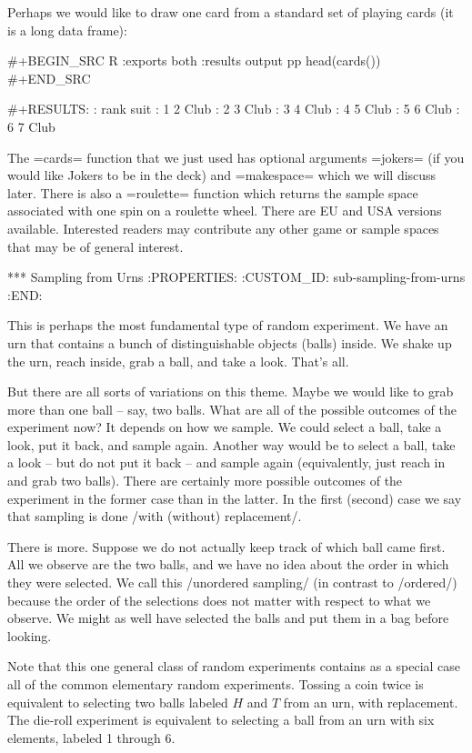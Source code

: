 Perhaps we would like to draw one card from a standard set of playing
cards (it is a long data frame):

#+BEGIN_SRC R :exports both :results output pp
head(cards()) 
#+END_SRC

#+RESULTS:
:   rank suit
: 1    2 Club
: 2    3 Club
: 3    4 Club
: 4    5 Club
: 5    6 Club
: 6    7 Club

The =cards= function that we just used has optional arguments =jokers=
(if you would like Jokers to be in the deck) and =makespace= which we
will discuss later. There is also a =roulette= function which returns
the sample space associated with one spin on a roulette wheel. There
are EU and USA versions available. Interested readers may contribute
any other game or sample spaces that may be of general interest.

*** Sampling from Urns
:PROPERTIES:
:CUSTOM_ID: sub-sampling-from-urns
:END:

This is perhaps the most fundamental type of random experiment. We
have an urn that contains a bunch of distinguishable objects (balls)
inside. We shake up the urn, reach inside, grab a ball, and take a
look. That's all.

But there are all sorts of variations on this theme. Maybe we would
like to grab more than one ball -- say, two balls. What are all of the
possible outcomes of the experiment now? It depends on how we
sample. We could select a ball, take a look, put it back, and sample
again. Another way would be to select a ball, take a look -- but do
not put it back -- and sample again (equivalently, just reach in and
grab two balls). There are certainly more possible outcomes of the
experiment in the former case than in the latter. In the first
(second) case we say that sampling is done /with (without)
replacement/.

There is more. Suppose we do not actually keep track of which ball
came first. All we observe are the two balls, and we have no idea
about the order in which they were selected. We call this /unordered
sampling/ (in contrast to /ordered/) because the order of the
selections does not matter with respect to what we observe. We might
as well have selected the balls and put them in a bag before looking.

Note that this one general class of random experiments contains as a
special case all of the common elementary random experiments. Tossing
a coin twice is equivalent to selecting two balls labeled \(H\) and
\(T\) from an urn, with replacement. The die-roll experiment is
equivalent to selecting a ball from an urn with six elements, labeled
1 through 6.

